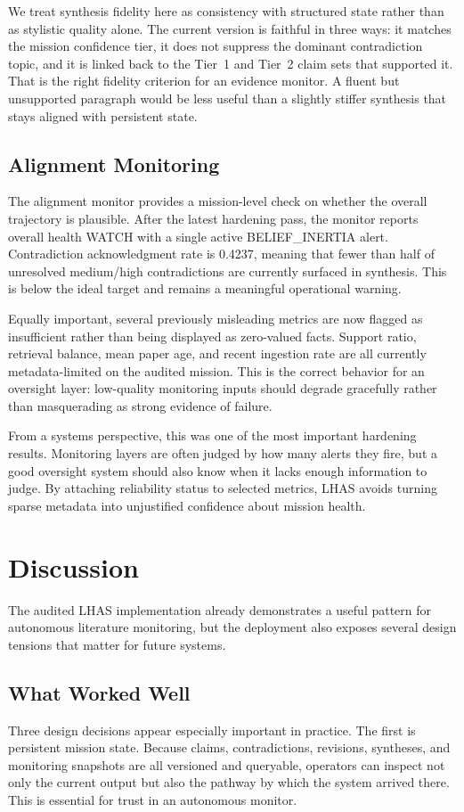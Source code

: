 \documentclass[manuscript,screen,review]{jair}
\begin{document}
We treat synthesis fidelity here as consistency with structured state rather than as stylistic quality alone. The current version is faithful in three ways: it matches the mission confidence tier, it does not suppress the dominant contradiction topic, and it is linked back to the Tier~1 and Tier~2 claim sets that supported it. That is the right fidelity criterion for an evidence monitor. A fluent but unsupported paragraph would be less useful than a slightly stiffer synthesis that stays aligned with persistent state.

\subsection{Alignment Monitoring}
The alignment monitor provides a mission-level check on whether the overall trajectory is plausible. After the latest hardening pass, the monitor reports overall health WATCH with a single active BELIEF\_INERTIA alert. Contradiction acknowledgment rate is 0.4237, meaning that fewer than half of unresolved medium/high contradictions are currently surfaced in synthesis. This is below the ideal target and remains a meaningful operational warning.

Equally important, several previously misleading metrics are now flagged as insufficient rather than being displayed as zero-valued facts. Support ratio, retrieval balance, mean paper age, and recent ingestion rate are all currently metadata-limited on the audited mission. This is the correct behavior for an oversight layer: low-quality monitoring inputs should degrade gracefully rather than masquerading as strong evidence of failure.

From a systems perspective, this was one of the most important hardening results. Monitoring layers are often judged by how many alerts they fire, but a good oversight system should also know when it lacks enough information to judge. By attaching reliability status to selected metrics, LHAS avoids turning sparse metadata into unjustified confidence about mission health.

\section{Discussion}
The audited LHAS implementation already demonstrates a useful pattern for autonomous literature monitoring, but the deployment also exposes several design tensions that matter for future systems.

\subsection{What Worked Well}
Three design decisions appear especially important in practice. The first is persistent mission state. Because claims, contradictions, revisions, syntheses, and monitoring snapshots are all versioned and queryable, operators can inspect not only the current output but also the pathway by which the system arrived there. This is essential for trust in an autonomous monitor.
\end{document}
